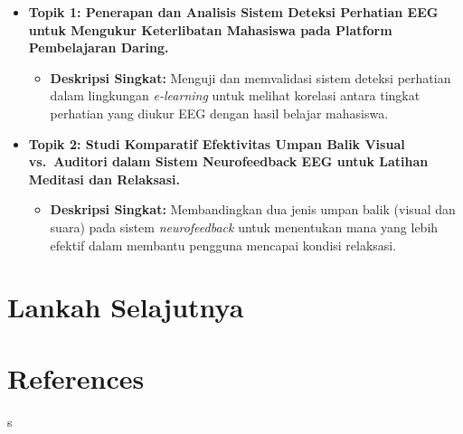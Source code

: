 \documentclass[
  letterpaper,
  DIV=11,
  numbers=noendperiod]{scrreprt}
\providecommand{\tightlist}{%
  \setlength{\itemsep}{0pt}\setlength{\parskip}{0pt}}
\begin{document}
\begin{itemize}
\tightlist
\item
  \textbf{Topik 1: Penerapan dan Analisis Sistem Deteksi Perhatian EEG
  untuk Mengukur Keterlibatan Mahasiswa pada Platform Pembelajaran
  Daring.}

  \begin{itemize}
  \tightlist
  \item
    \textbf{Deskripsi Singkat:} Menguji dan memvalidasi sistem deteksi
    perhatian dalam lingkungan \emph{e-learning} untuk melihat korelasi
    antara tingkat perhatian yang diukur EEG dengan hasil belajar
    mahasiswa.
  \end{itemize}
\item
  \textbf{Topik 2: Studi Komparatif Efektivitas Umpan Balik Visual
  vs.~Auditori dalam Sistem Neurofeedback EEG untuk Latihan Meditasi dan
  Relaksasi.}

  \begin{itemize}
  \tightlist
  \item
    \textbf{Deskripsi Singkat:} Membandingkan dua jenis umpan balik
    (visual dan suara) pada sistem \emph{neurofeedback} untuk menentukan
    mana yang lebih efektif dalam membantu pengguna mencapai kondisi
    relaksasi.
  \end{itemize}
\end{itemize}


\chapter{Lankah Selajutnya}\label{lankah-selajutnya}


\chapter*{References}\label{references}


s
\end{document}

